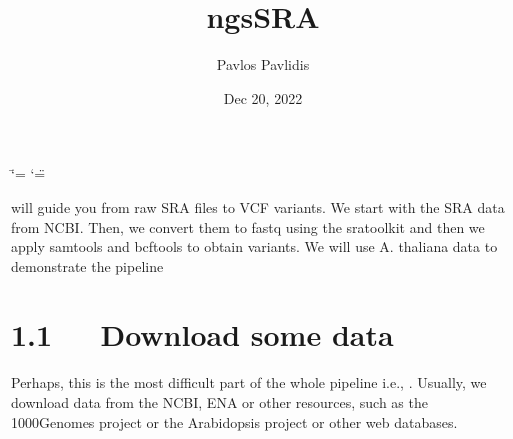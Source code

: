 \documentclass[letterpaper,10pt,english]{sphinxmanual}
\title{ngsSRA}
\date{Dec 20, 2022}
\author{Pavlos Pavlidis}
\begin{document}
\ifdefined\shorthandoff
  \ifnum\catcode`\=\string=\active\shorthandoff{=}\fi
  \ifnum\catcode`\"=\active{}\fi
\fi

\pagestyle{empty}
\sphinxmaketitle
\pagestyle{plain}
\sphinxtableofcontents
\pagestyle{normal}
\label{\detokenize{index::doc}}


\sphinxAtStartPar
{} will guide you from raw SRA files to VCF variants.
We start with the SRA data from NCBI. Then, we convert them to fastq using the sra\sphinxhyphen{}toolkit and then we apply samtools and bcftools to obtain variants.
We will use A. thaliana data to demonstrate the pipeline


\chapter{1.1   Download some data}
\label{\detokenize{index:download-some-data}}
\sphinxAtStartPar
Perhaps, this is the most difficult part of the whole pipeline i.e., . Usually, we download data from the NCBI, ENA or other resources, such as the 1000Genomes project or the Arabidopsis project or other web databases.
\end{document}
